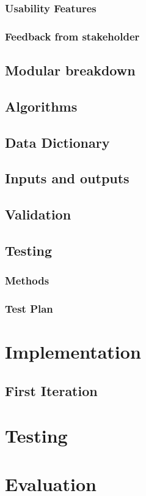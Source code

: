 \documentclass{article}
\begin{document}
\subsubsection{Usability Features}

\subsubsection{Feedback from stakeholder}

\subsection{Modular breakdown}

\subsection{Algorithms}

\subsection{Data Dictionary}

\subsection{Inputs and outputs}

\subsection{Validation}

\subsection{Testing}

\subsubsection{Methods}

\subsubsection{Test Plan}

\section{Implementation}

\subsection{First Iteration}

\section{Testing}

\section{Evaluation}
\end{document}
